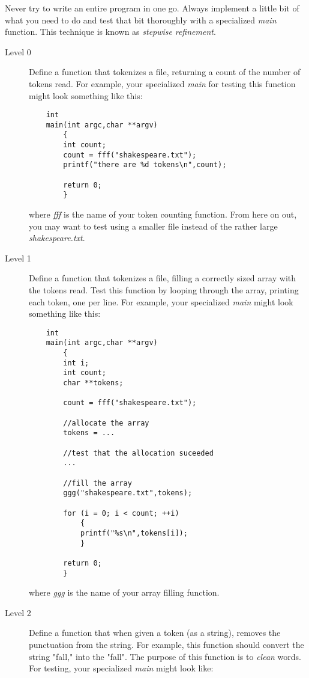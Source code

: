 \documentclass[12pt]{article}
\begin{document}
Never try to write an entire program in one go. Always implement
a little bit of what you need to do and test that bit thoroughly
with a specialized {\it main} function. This technique is known
as {\it stepwise} {\it refinement}.

\begin{description}
\item[Level 0]
Define a function that tokenizes a file, returning a count of
the number of tokens read.
For example, your specialized {\it main} for testing
this function might look something like this:

\begin{verbatim}
    int
    main(int argc,char **argv)
        {
        int count;
        count = fff("shakespeare.txt");
        printf("there are %d tokens\n",count);

        return 0;
        }
\end{verbatim}

where {\it fff} is the name of your token counting function.
From here on out, you may want to test using a smaller file instead of
the rather large {\it shakespeare.txt}.

\item[Level 1]
Define a function that tokenizes a file, filling a
correctly sized array with
the tokens read.
Test this function by looping through the array,
printing each token, one per line.
For example, your specialized {\it main} might look something like this:

\begin{verbatim}
    int
    main(int argc,char **argv)
        {
        int i;
        int count;
        char **tokens;

        count = fff("shakespeare.txt");

        //allocate the array
        tokens = ...
        
        //test that the allocation suceeded
        ...

        //fill the array
        ggg("shakespeare.txt",tokens);

        for (i = 0; i < count; ++i)
            {
            printf("%s\n",tokens[i]);
            }

        return 0;
        }
\end{verbatim}

where {\it ggg} is
the name of your array filling function.

\item[Level 2]
Define a function that when given a token (as a string), removes
the punctuation from the string.
For example, this function should
convert the string "fall," into the "fall".
The purpose of this function is to {\it clean} words.
For testing, your specialized {\it main} might look like:


\end{description}
\end{document}
